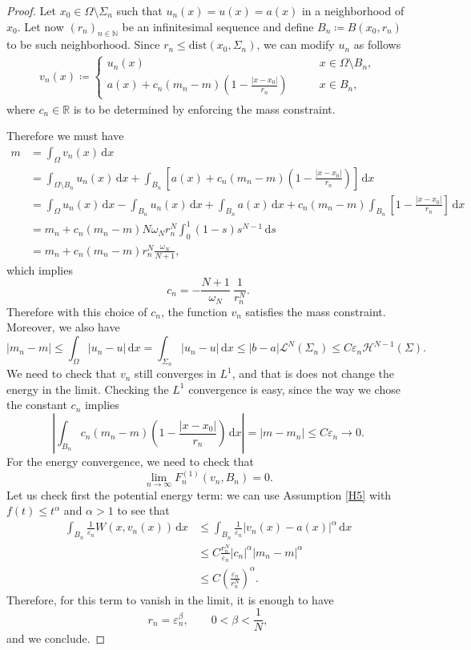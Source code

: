 \documentclass[a4paper, 11pt, reqno]{amsart}
\theoremstyle{plain}
\theoremstyle{definition}
\theoremstyle{remark}
\newcommand{\N}{\mathbb N}
\newcommand{\R}{\mathbb R}
\renewcommand{\ln}{{\mathcal{L}^N}}
\newcommand{\dd}{\,\mathrm{d}}
\begin{document}
\begin{proof}
Let $x_0 \in \Omega \setminus \Sigma_n$ such that $u_n (x) = u(x) = a(x)$ in a neighborhood of $x_0$. Let now $(r_n)_{n \in \N}$ be an infinitesimal sequence and define $B_n \coloneqq B (x_0, r_n)$ to be such neighborhood. Since $r_n \leq \mathrm{dist}(x_0,\Sigma_n) $, we can modify $u_n$ as follows
\begin{gather*}
    v_n (x) \coloneqq \begin{cases}
        u_n(x) \qquad &x \in \Omega \setminus B_n, \\
        a(x) + c_n (m_n - m) \left( 1 - \frac{|x - x_0|}{r_n} \right) \qquad &x \in B_n,
    \end{cases}
\end{gather*}
where $c_n \in \R$ is to be determined by enforcing the mass constraint.

Therefore we must have
\begin{align*}
    m &= \int_\Omega v_n (x) \dd x \\
    &= \int_{\Omega \setminus B_n} u_n(x) \dd x + \int_{B_n} \left[ a(x) + c_n (m_n - m) \left( 1 - \frac{|x - x_0|}{r_n} \right) \right] \dd x \\
    &= \int_\Omega u_n (x) \dd x - \int_{B_n} u_n (x) \dd x + \int_{B_n} a(x) \dd x + c_n (m_n - m) \int_{B_n} \left[ 1 - \frac{|x - x_0|}{r_n}\right] \dd x \\
    &= m_n + c_n (m_n - m) N \omega_N r_n^N \int_0^1 ( 1 - s) s^{N-1} \dd s \\
    &= m_n + c_n (m_n - m) r_n^N \frac{\omega_N}{N+1},
\end{align*}
which implies
$$ c_n = - \frac{N+1}{\omega_N} \ \frac{1}{r_n^N}.$$
Therefore with this choice of $c_n$, the function $v_n$ satisfies the mass constraint. 
Moreover, we also have
$$ | m_n - m| \leq \int_\Omega |u_n - u| \dd x = \int_{\Sigma_n} |u_n - u| \dd x \leq |b-a| \ln(\Sigma_n) \leq C \varepsilon_n \mathcal{H}^{N-1}(\Sigma). $$
We need to check that $v_n$ still converges in $L^1$, and that is does not change the energy in the limit. Checking the $L^1$ convergence is easy, since the way we chose the constant $c_n$ implies
$$ \left| \int_{B_n} c_n (m_n - m) \left( 1 - \frac{|x - x_0|}{r_n} \right) \dd x  \right| = | m - m_n | \leq C \varepsilon_n \to 0. $$
For the energy convergence, we need to check that
$$ \lim_{n \to \infty} F_n^{(1)} (v_n, B_n) = 0. $$
Let us check first the potential energy term: we can use Assumption \ref{H5} with $f(t) \leq t^\alpha$ and $\alpha > 1$ to see that
\begin{align}
	\int_{B_n} \frac{1}{\varepsilon_n} W \left( x, v_n(x) \right) \dd x &\leq \int_{B_n} \frac{1}{\varepsilon_n} | v_n(x) - a(x)|^\alpha \dd x \\
    &\leq C \frac{r_n^N}{\varepsilon_n} | c_n |^\alpha |m_n - m|^\alpha \\
    &\leq C \left( \frac{\varepsilon_n}{r_n^N} \right)^\alpha.
\end{align}
Therefore, for this term to vanish in the limit, it is enough to have 
$$ r_n = \varepsilon_n^\beta, \qquad 0 < \beta < \frac{1}{N}, $$
and we conclude.
\end{proof}
\end{document}
